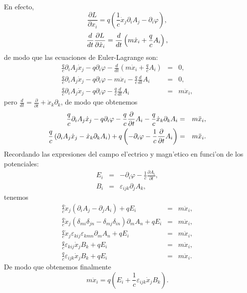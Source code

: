 En efecto,
\begin{equation}
\frac{\partial L}{\partial x_i} =q\left( \frac{1}{c}\dot{x}_{j}\partial
_iA_{j}-\partial _i\varphi \right),
\end{equation} 
\begin{equation}
\frac{d}{dt}\frac{\partial L}{\partial \dot{x}_i}=\frac{d}{dt}\left( m\dot{%
x}_i+\frac{q}{c}A_i\right) ,
\end{equation}
de modo que las ecuaciones de Euler-Lagrange son:
\begin{eqnarray}
\frac{q}{c}\partial _iA_{j}\dot{x}_{j}-q\partial _i\varphi -\frac{d}{dt}%
\left( m\dot{x}_i+\frac{q}{c}A_i\right) &=&0 ,\\
\frac{q}{c}\partial _iA_{j}\dot{x}_{j}-q\partial _i\varphi -m\ddot{x}_i-%
\frac{q}{c}\frac{d}{dt}A_i &=&0 ,\\
\frac{q}{c}\partial _iA_{j}\dot{x}_{j}-q\partial _i\varphi -\frac{q}{c}%
\frac{d}{dt}A_i &=&m\ddot{x}_i,
\end{eqnarray}
pero $\frac{d}{dt}=\frac{\partial }{\partial t}+\dot{x}_k\partial _k$, de
modo que obtenemos
\begin{eqnarray}
\frac{q}{c}\partial _iA_{j}\dot{x}_{j}-q\partial _i\varphi -\frac{q}{c}%
\frac{\partial }{\partial t}A_i-\frac{q}{c}\dot{x}_k\partial _kA_i
&=&m\ddot{x}_i, \\
\frac{q}{c}\left( \partial _iA_{j}\dot{x}_{j}-\dot{x}_k\partial
_kA_i\right) +q\left( -\partial _i\varphi -\frac{1}{c}\frac{\partial }{%
\partial t}A_i\right) &=&m\ddot{x}_i.
\end{eqnarray}
Recordando las expresiones del campo el'ectrico y magn'etico en funci'on de los
potenciales:
\begin{eqnarray}
E_i &=&-\partial _i\varphi -\frac{1}{c}\frac{\partial A_i}{\partial t}, \\
B_i &=&\varepsilon _{ijk}\partial _{j}A_k,
\end{eqnarray}
tenemos 
\begin{eqnarray}
\frac{q}{c}\dot{x}_{j}\left( \partial _iA_{j}-\partial _{j}A_i\right)
+qE_i &=&m\ddot{x}_i, \\
\frac{q}{c}\dot{x}_{j}\left( \delta _{mi}\delta _{jn}-\delta _{mj}\delta
_{in}\right) \partial _{m}A_{n}+qE_i &=&m\ddot{x}_i ,\\
\frac{q}{c}\dot{x}_{j}\varepsilon _{kij}\varepsilon _{kmn}\partial
_{m}A_{n}+qE_i &=&m\ddot{x}_i ,\\
\frac{q}{c}\varepsilon _{kij}\dot{x}_{j}B_k+qE_i &=&m\ddot{x}_i ,\\
\frac{q}{c}\varepsilon _{ijk}\dot{x}_{j}B_k+qE_i &=&m\ddot{x}_i .
\end{eqnarray}
De modo que obtenemos finalmente
\begin{equation}
m\ddot{x}_i=q\left( E_i+\frac{1}{c}\varepsilon _{ijk}\dot{x}%
_{j}B_k\right) . 
\end{equation}


